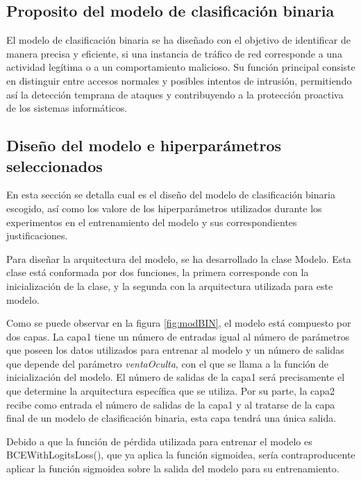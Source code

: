 
\subsection{Proposito del modelo de clasificación binaria}
El modelo de clasificación binaria se ha diseñado con el objetivo de identificar de manera precisa y eficiente, si una instancia de tráfico de red corresponde a una actividad legítima o a un comportamiento malicioso. Su función principal consiste en distinguir entre accesos normales y posibles intentos de intrusión, permitiendo así la detección temprana de ataques y contribuyendo a la protección proactiva de los sistemas informáticos.

\subsection{Diseño del modelo e hiperparámetros seleccionados} \label{sec:disBIN}
En esta sección se detalla cual es el diseño del modelo de clasificación binaria escogido, así como los valore de los hiperparámetros utilizados durante los experimentos en el entrenamiento del modelo y sus correspondientes justificaciones.

Para diseñar la arquitectura del modelo, se ha desarrollado la clase Modelo. Esta clase está conformada por dos funciones, la primera corresponde con la inicialización de la clase, y la segunda con la arquitectura utilizada para este modelo.

Como se puede observar en la figura \ref{fig:modBIN}, el modelo está compuesto por dos capas. La capa1 tiene un número de entradas igual al número de parámetros que poseen los datos utilizados para entrenar al modelo y un número de salidas que depende del parámetro \textit{ventaOculta}, con el que se llama a la función de inicialización del modelo. El número de salidas de la capa1 será precisamente el que determine la arquitectura específica que se utiliza. Por su parte, la capa2 recibe como entrada el número de salidas de la capa1 y al tratarse de la capa final de un modelo de clasificación binaria, esta capa tendrá una única salida.

Debido a que la función de pérdida utilizada para entrenar el modelo es BCEWithLogitsLoss(), que ya aplica la función sigmoidea, sería contraproducente aplicar la función sigmoidea sobre la salida del modelo para su entrenamiento.


